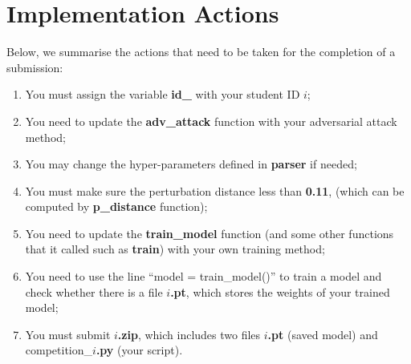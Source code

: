 \section{Implementation Actions}

Below, we summarise the actions that need to be taken for the completion of a submission: 

\begin{enumerate}
    \item You must assign the variable \textbf{id\_} with your student ID $i$;
    \item You need to update the \textbf{adv\_attack} function with your adversarial attack method; 
    \item You may change the hyper-parameters defined in \textbf{parser} if needed; 
    \item You must make sure the perturbation distance less than \textbf{0.11}, (which can be computed by \textbf{p\_distance} function); 
    \item You need to update the \textbf{train\_model} function (and some other functions that it called such as \textbf{train}) with your own training method;
    \item You need to use the line ``model = train\_model()'' to train a model and check whether there is a file $i$\textbf{.pt}, which stores the weights of your trained model;
    \item You must submit $i$\textbf{.zip}, which includes two files $i$\textbf{.pt} (saved model) and competition\_$i$\textbf{.py} (your script). 
\end{enumerate}





